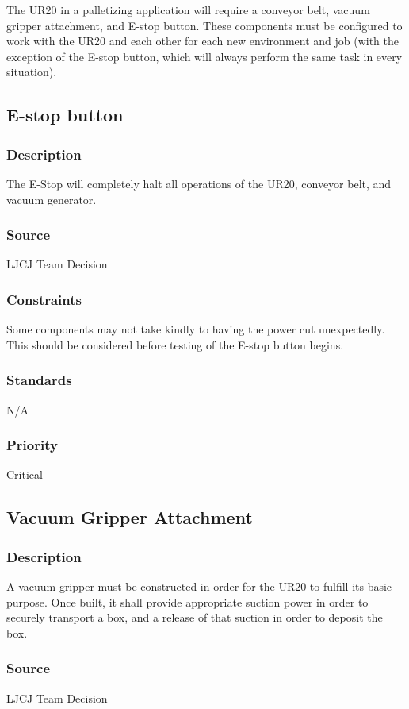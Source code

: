 The UR20 in a palletizing application will require a conveyor belt, vacuum gripper attachment, and E-stop button. These components must be configured to work with the UR20 and each other for each new environment and job (with the exception of the E-stop button, which will always perform the same task in every situation).

\subsection{E-stop button}
\subsubsection{Description}
The E-Stop will completely halt all operations of the UR20, conveyor belt, and vacuum generator. 
\subsubsection{Source}
LJCJ Team Decision
\subsubsection{Constraints}
Some components may not take kindly to having the power cut unexpectedly. This should be considered before testing of the E-stop button begins.
\subsubsection{Standards}
N/A
\subsubsection{Priority}
Critical

\subsection{Vacuum Gripper Attachment}
\subsubsection{Description}
A vacuum gripper must be constructed in order for the UR20 to fulfill its basic purpose. Once built, it shall provide appropriate suction power in order to securely transport a box, and a release of that suction in order to deposit the box.
\subsubsection{Source}
LJCJ Team Decision
